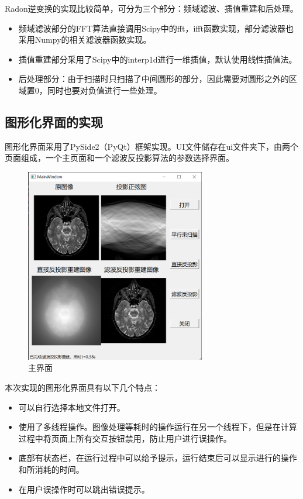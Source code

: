 \documentclass[UTF8]{ctexart}
\begin{document}
Radon逆变换的实现比较简单，可分为三个部分：频域滤波、插值重建和后处理。
\begin{itemize}
    \item 频域滤波部分的FFT算法直接调用Scipy中的fft，ifft函数实现，部分滤波器也采用Numpy的相关滤波器函数实现。
    \item 插值重建部分采用了Scipy中的interp1d进行一维插值，默认使用线性插值法。
    \item 后处理部分：由于扫描时只扫描了中间圆形的部分，因此需要对圆形之外的区域置0，同时也要对负值进行一些处理。
\end{itemize}

\subsection{图形化界面的实现}

图形化界面采用了PySide2（PyQt）框架实现。UI文件储存在ui文件夹下，由两个页面组成，一个主页面和一个滤波反投影算法的参数选择界面。

\begin{figure}[H]
    \centering
    \includegraphics[width=0.7\textwidth]{../image/main_UI.png}
    \caption{主界面}
    \label{fig UI}
\end{figure}

本次实现的图形化界面具有以下几个特点：
\begin{itemize}
    \item 可以自行选择本地文件打开。
    \item 使用了多线程操作。图像处理等耗时的操作运行在另一个线程下，但是在计算过程中将页面上所有交互按钮禁用，防止用户进行误操作。
    \item 底部有状态栏，在运行过程中可以给予提示，运行结束后可以显示进行的操作和所消耗的时间。
    \item 在用户误操作时可以跳出错误提示。
\end{itemize}
\newpage
\end{document}
